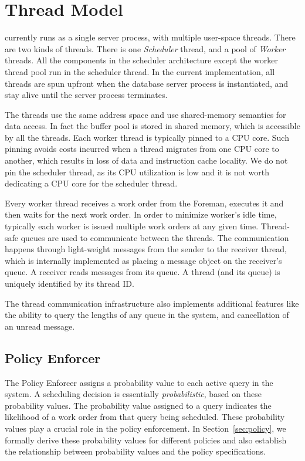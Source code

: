 \section{Thread Model}\label{sec:thread-model}
\sys{} currently runs as a single server process, with multiple user-space threads. 
There are two kinds of threads. 
There is one \textit{Scheduler} thread, and a pool of \textit{Worker} threads. 
All the components in the scheduler architecture except the worker thread pool run in the 
scheduler thread. 
In the current implementation, all threads are spun upfront when the database server 
process is instantiated, and stay alive until the server process terminates.

The threads use the same address space and use shared-memory semantics for data 
access. 
In fact the buffer pool is stored in shared memory, which is accessible by all the threads. 
Each worker thread is typically pinned to a CPU core. 
Such pinning avoids costs incurred when a thread migrates from one CPU core to another, which results in loss of data and instruction cache locality. 
We do not pin the scheduler thread, as its CPU utilization is low and it is not worth dedicating a CPU core for the scheduler thread.

Every worker thread receives a work order from the Foreman, executes it and then waits for the next work order.
In order to minimize worker's idle time, typically each worker is issued multiple work 
orders at any given time. 
Thread-safe queues are used to communicate between the threads.
The communication happens through light-weight messages from the sender to the receiver thread, which is internally implemented as placing a message object on the receiver's queue. 
A receiver reads messages from its queue. 
A thread (and its queue) is uniquely identified by its thread ID. 

The thread communication infrastructure also implements additional features like the ability to query the lengths of any queue in the system, and cancellation of an unread message. 

\subsection{Policy Enforcer}\label{ssec:policy-enforcer}
The Policy Enforcer assigns a probability value to each active query in the system. 
A scheduling decision is essentially \textit{probabilistic}, based on these probability values. 
The probability value assigned to a query indicates the likelihood of a work order from that query being scheduled. 
These probability values play a crucial role in the policy enforcement.
In Section~\ref{sec:policy}, we formally derive these probability values for different policies and also establish the relationship between probability values and the policy specifications.

